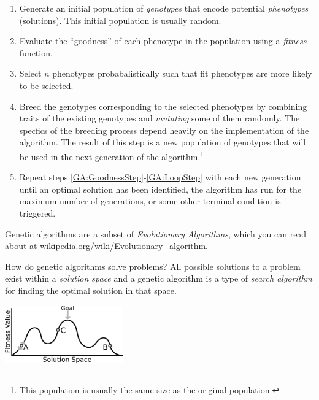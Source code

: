 \begin{enumerate}
  \item Generate an initial population of {\em genotypes} that encode potential
  {\em phenotypes} (solutions). This initial population is usually random.

  \item Evaluate the ``goodness'' of each phenotype in the population using a 
  {\em fitness} function. \label{GA:GoodnessStep}

  \item Select $n$ phenotypes probabalistically such that fit phenotypes 
  are more likely to be selected.

  \item Breed the genotypes corresponding to the selected phenotypes by combining 
  traits of the existing genotypes and {\em mutating} some of them randomly. 
  The specfics of the breeding process depend heavily on the implementation of the algorithm.
  The result of this step is a new population of genotypes that will be used in
  the next generation of the algorithm.\footnote{This population is usually the
  same size as the original population.} 

  \item Repeat steps \ref{GA:GoodnessStep}-\ref{GA:LoopStep} with each new generation 
  until an optimal solution has been identified, the algorithm has run for the maximum 
  number of generations, or some other terminal condition is triggered. \label{GA:LoopStep}

\end{enumerate}

Genetic algorithms are a subset of {\em Evolutionary Algorithms}, which you can
read about at \url{wikipedia.org/wiki/Evolutionary_algorithm}.

How do genetic algorithms solve problems? All possible solutions to a problem
exist within a {\em solution space} and a genetic algorithm is a type of
{\em search algorithm} for finding the optimal solution in that space.

\beforefig
\centerline{\includegraphics[width=2in]{./pycritters_figs/GeneticAlgStateSpace.eps}}
\afterfig

